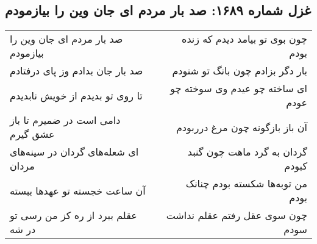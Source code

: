 \begin{center}
\section*{غزل شماره ۱۶۸۹: صد بار مردم ای جان وین را بیازمودم}
\label{sec:1689}
\begin{longtable}{l p{0.5cm} r}
صد بار مردم ای جان وین را بیازمودم
&&
چون بوی تو بیامد دیدم که زنده بودم
\\
صد بار جان بدادم وز پای درفتادم
&&
بار دگر بزادم چون بانگ تو شنودم
\\
تا روی تو بدیدم از خویش نابدیدم
&&
ای ساخته چو عیدم وی سوخته چو عودم
\\
دامی است در ضمیرم تا باز عشق گیرم
&&
آن باز بازگونه چون مرغ درربودم
\\
ای شعله‌های گردان در سینه‌های مردان
&&
گردان به گرد ماهت چون گنبد کبودم
\\
آن ساعت خجسته تو عهدها ببسته
&&
من توبه‌ها شکسته بودم چنانک بودم
\\
عقلم ببرد از ره کز من رسی تو در شه
&&
چون سوی عقل رفتم عقلم نداشت سودم
\\
\end{longtable}
\end{center}
